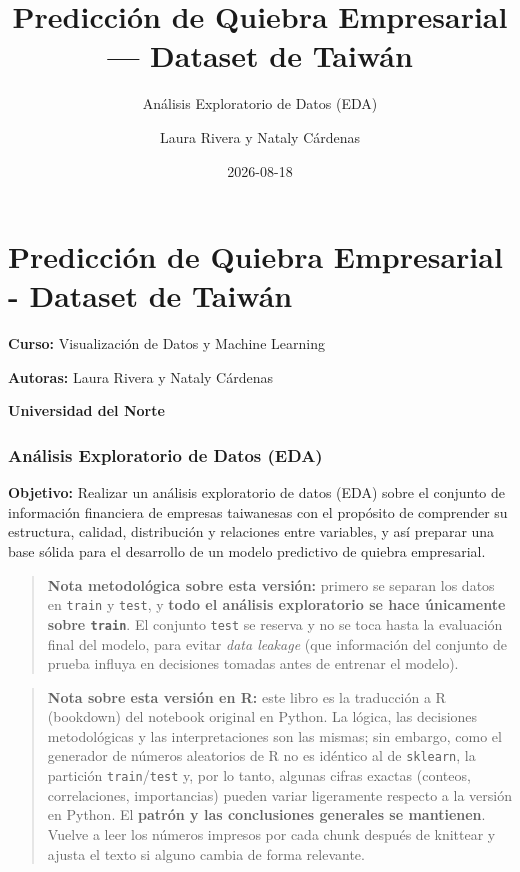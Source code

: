 \documentclass[
]{book}
\title{Predicción de Quiebra Empresarial --- Dataset de Taiwán}
\subtitle{Análisis Exploratorio de Datos (EDA)}
\author{Laura Rivera y Nataly Cárdenas}
\date{2026-08-18}
\begin{document}
\maketitle

{
\setcounter{tocdepth}{1}
\tableofcontents
}
\chapter*{Predicción de Quiebra Empresarial - Dataset de Taiwán}\label{predicciuxf3n-de-quiebra-empresarial---dataset-de-taiwuxe1n}

\textbf{Curso:} Visualización de Datos y Machine Learning

\textbf{Autoras:} Laura Rivera y Nataly Cárdenas

\textbf{Universidad del Norte}

\subsection*{Análisis Exploratorio de Datos (EDA)}\label{anuxe1lisis-exploratorio-de-datos-eda}

\textbf{Objetivo:} Realizar un análisis exploratorio de datos (EDA) sobre el conjunto de
información financiera de empresas taiwanesas con el propósito de comprender su
estructura, calidad, distribución y relaciones entre variables, y así preparar una
base sólida para el desarrollo de un modelo predictivo de quiebra empresarial.

\begin{quote}
\textbf{Nota metodológica sobre esta versión:} primero se separan los datos en \texttt{train}
y \texttt{test}, y \textbf{todo el análisis exploratorio se hace únicamente sobre \texttt{train}}. El
conjunto \texttt{test} se reserva y no se toca hasta la evaluación final del modelo, para
evitar \emph{data leakage} (que información del conjunto de prueba influya en decisiones
tomadas antes de entrenar el modelo).
\end{quote}

\begin{quote}
\textbf{Nota sobre esta versión en R:} este libro es la traducción a R (bookdown) del
notebook original en Python. La lógica, las decisiones metodológicas y las
interpretaciones son las mismas; sin embargo, como el generador de números
aleatorios de R no es idéntico al de \texttt{sklearn}, la partición \texttt{train}/\texttt{test} y,
por lo tanto, algunas cifras exactas (conteos, correlaciones, importancias) pueden
variar ligeramente respecto a la versión en Python. El \textbf{patrón y las conclusiones
generales se mantienen}. Vuelve a leer los números impresos por cada chunk después
de knittear y ajusta el texto si alguno cambia de forma relevante.
\end{quote}
\end{document}
